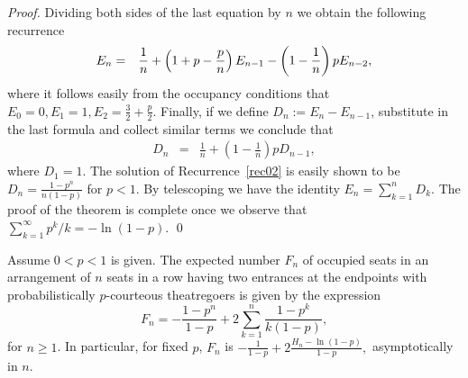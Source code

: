 \documentclass[11pt]{llncs}
\begin{document}
\begin{proof}
Dividing both sides of the last equation
by $n$ we obtain the following recurrence
\begin{eqnarray}
E_n 
&=& \notag
\frac{1}{n} + 
\left( 1 + p - \frac{p}{n} \right) E_{n-1}
-\left(1-\frac{1}{n} \right)pE_{n-2},
\end{eqnarray}
where it follows easily from the occupancy conditions that
$E_0 = 0, E_1 = 1, E_2 = \frac{3}{2} + \frac{p}{2}$. 
Finally,
if we define $D_n := E_n - E_{n-1}$, substitute
in the last formula and collect similar terms
we conclude that
\begin{eqnarray}
D_n
&=& \label{rec02}
\frac{1}{n} + 
\left(1-\frac{1}{n} \right)p D_{n-1},
\end{eqnarray}
where $D_1 = 1$. The solution of Recurrence~\eqref{rec02}
is easily shown to be $D_n = \frac{1-p^n}{n(1-p)}$ for $p<1$.
By telescoping we have the identity $E_n = \sum_{k=1}^n D_k $. The proof of the theorem is complete once we observe that $\sum_{k=1}^\infty p^k/k = - \ln (1-p)$.
\qed
\end{proof}

\begin{comment}
As an immediate corollary,
using the expansion (in the variable $p$) of the logarithmic
function $\ln (1-p)$ in a Taylor series
we derive the following result.

\begin{corollary}
For firxed $0 <p<1$,
the
expected number $E_n$ of occupied seats in an arrangement of $n$ seats
in a row having only one entrance
with probabilistically $p$-courteous
theatregoers is given by the expression
\begin{equation}
\label{pach1a}
\frac{H_n - \ln (1-p)}{1-p},
\end{equation}
asymptotically in $n$.
\qed
\end{corollary}
\end{comment}



\begin{theorem}
\label{thm02p}
Assume $0 < p < 1$ is given.
The
expected number $F_n$ of occupied seats in an arrangement of $n$ seats
in a row having two entrances at the endpoints
with probabilistically $p$-courteous
theatregoers is given by the expression
\begin{equation}
\label{pach2}
F_n =
-\frac{1-p^n}{1-p} + 2 \sum_{k=1}^n \frac{1-p^k}{k(1-p)},
\end{equation}
for $n \geq 1$. In particular, for fixed $p$, $F_n$ is $-\frac{1}{1-p} + 2\frac{H_n - \ln (1-p)}{1-p},$
asymptotically in $n$.
\end{theorem}
\end{document}
